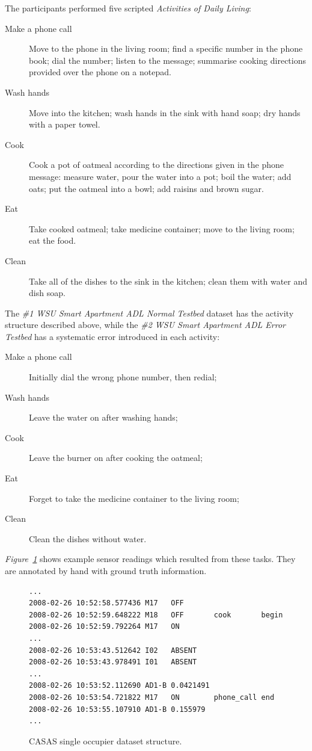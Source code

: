 \documentclass[10pt, a4paper, pdflatex, leqno, twoside, openright]{report}
\begin{document}
The participants performed five scripted \emph{Activities of Daily Living}:
\begin{description}
\item[Make a phone call] Move to the phone in the living room; find a specific number in the phone book; dial the number; listen to the message; summarise cooking directions provided over the phone on a notepad.
\item[Wash hands] Move into the kitchen; wash hands in the sink with hand soap; dry hands with a paper towel.
\item[Cook] Cook a pot of oatmeal according to the directions given in the phone message: measure water, pour the water into a pot; boil the water; add oats; put the oatmeal into a bowl; add raisins and brown sugar.
\item[Eat] Take cooked oatmeal; take medicine container; move to the living room; eat the food.
\item[Clean] Take all of the dishes to the sink in the kitchen; clean them with water and dish soap.
\end{description}

The \emph{\#1 WSU Smart Apartment ADL Normal Testbed} dataset has the activity structure described above, while the \emph{\#2 WSU Smart Apartment ADL Error Testbed} has a systematic error introduced in each activity:
\begin{description}
\item[Make a phone call] Initially dial the wrong phone number, then redial;
\item[Wash hands] Leave the water on after washing hands;
\item[Cook] Leave the burner on after cooking the oatmeal;
\item[Eat] Forget to take the medicine container to the living room;
\item[Clean] Clean the dishes without water.
\end{description}

\emph{Figure~\ref{lst:CASASoneR}} shows example sensor readings which resulted from these tasks. They are annotated by hand with ground truth information.
\begin{figure}[htb]
  \begin{lstlisting}
...
2008-02-26 10:52:58.577436 M17   OFF
2008-02-26 10:52:59.648222 M18   OFF       cook       begin
2008-02-26 10:52:59.792264 M17   ON
...
2008-02-26 10:53:43.512642 I02   ABSENT
2008-02-26 10:53:43.978491 I01   ABSENT
...
2008-02-26 10:53:52.112690 AD1-B 0.0421491
2008-02-26 10:53:54.721822 M17   ON        phone_call end
2008-02-26 10:53:55.107910 AD1-B 0.155979
...
  \end{lstlisting}
  \caption{CASAS single occupier dataset structure.\label{lst:CASASoneR}}
\end{figure}
\end{document}
